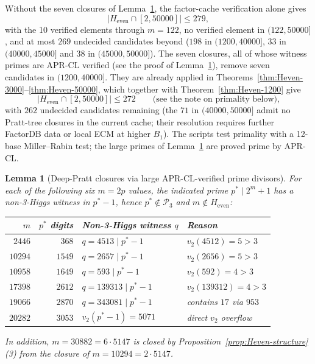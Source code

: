 \documentclass[11pt]{amsart}
\theoremstyle{plain}
\newtheorem{lemma}[theorem]{Lemma}
\theoremstyle{definition}
\begin{document}
Without the seven closures of Lemma~\ref{lem:closures-deep}, the
factor-cache verification alone gives
\[
|H_{\mathrm{even}} \cap [2, 50000]| \le 279,
\]
with the 10 verified elements through $m = 122$, no verified element
in $(122, 50000]$, and at most $269$ undecided candidates beyond
($198$ in $(1200, 40000]$, $33$ in $(40000, 45000]$ and $38$ in
$(45000, 50000]$). The seven closures, all of whose witness primes are
APR-CL verified (see the proof of Lemma~\ref{lem:closures-deep}), remove
seven candidates in $(1200, 40000]$. They are already applied in
Theorems~\ref{thm:Heven-3000}--\ref{thm:Heven-50000}, which together with
Theorem~\ref{thm:Heven-1200} give
\[
|H_{\mathrm{even}} \cap [2, 50000]| \le 272
\qquad
\text{(see the note on primality below),}
\]
with $262$ undecided candidates remaining (the $71$ in $(40000, 50000]$
admit no Pratt-tree closures in the current cache; their resolution
requires further FactorDB data or local ECM at higher $B_1$).  The scripts test primality with a 12-base Miller--Rabin test; the large
primes of Lemma~\ref{lem:closures-deep} are proved prime by APR-CL.

\begin{lemma}[Deep-Pratt closures via large APR-CL-verified prime divisors]
\label{lem:closures-deep}
For each of the following six $m = 2p$ values, the indicated prime
$p^{*} \mid 2^m + 1$ has a non-3-Higgs witness in $p^{*} - 1$,
hence $p^{*} \notin \mathcal{P}_3$ and $m \notin H_{\mathrm{even}}$:
\begin{center}
\begin{tabular}{rrll}
\toprule
$m$ & $p^{*}$ digits & Non-3-Higgs witness $q$ & Reason \\
\midrule
$2446$  & $368$  & $q = 4513 \mid p^{*}-1$ & $v_2(4512) = 5 > 3$ \\
$10294$ & $1549$ & $q = 2657 \mid p^{*}-1$ & $v_2(2656) = 5 > 3$ \\
$10958$ & $1649$ & $q = 593 \mid p^{*}-1$ & $v_2(592) = 4 > 3$ \\
$17398$ & $2612$ & $q = 139313 \mid p^{*}-1$ & $v_2(139312) = 4 > 3$ \\
$19066$ & $2870$ & $q = 343081 \mid p^{*}-1$ & contains $17$ via $953$ \\
$20282$ & $3053$ & $v_2(p^{*}-1) = 5071$ & direct $v_2$ overflow \\
\bottomrule
\end{tabular}
\end{center}
In addition, $m = 30882 = 6 \cdot 5147$ is closed by
Proposition~\ref{prop:Heven-structure}(3) from the closure of
$m = 10294 = 2 \cdot 5147$.
\end{lemma}
\end{document}
